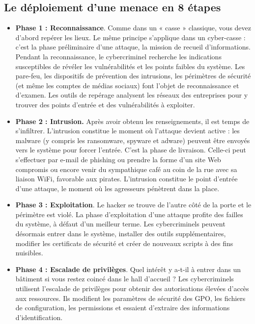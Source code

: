 \subsection{Le déploiement d'une menace en 8 étapes}


\begin{itemize}
  \item \textbf{Phase 1 : Reconnaissance}. Comme dans un « casse » classique, vous devez d’abord repérer les lieux. Le même principe s’applique dans un cyber-casse : c’est la phase préliminaire d’une attaque, la mission de recueil d’informations. Pendant la reconnaissance, le cybercriminel recherche les indications susceptibles de révéler les vulnérabilités et les points faibles du système. Les pare-feu, les dispositifs de prévention des intrusions, les périmètres de sécurité (et même les comptes de médias sociaux) font l’objet de reconnaissance et d’examen. Les outils de repérage analysent les réseaux des entreprises pour y trouver des points d’entrée et des vulnérabilités à exploiter.

 \item \textbf{Phase 2 : Intrusion.} Après avoir obtenu les renseignements, il est temps de s’infiltrer. L’intrusion constitue le moment où l’attaque devient active : les malware (y compris les ransomware, spyware et adware) peuvent être envoyés vers le système pour forcer l’entrée. C’est la phase de livraison. Celle-ci peut s’effectuer par e-mail de phishing ou prendre la forme d’un site Web compromis ou encore venir du sympathique café au coin de la rue avec sa liaison WiFi, favorable aux pirates. L’intrusion constitue le point d’entrée d’une attaque, le moment où les agresseurs pénètrent dans la place.

 \item \textbf{Phase 3 : Exploitation}. Le hacker se trouve de l’autre côté de la porte et le périmètre est violé. La phase d’exploitation d’une attaque profite des failles du système, à défaut d’un meilleur terme. Les cybercriminels peuvent désormais entrer dans le système, installer des outils supplémentaires, modifier les certificats de sécurité et créer de nouveaux scripts à des fins nuisibles.

 \item \textbf{Phase 4 : Escalade de privilèges}. Quel intérêt y a-t-il à entrer dans un bâtiment si vous restez coincé dans le hall d’accueil ? Les cybercriminels utilisent l’escalade de privilèges pour obtenir des autorisations élevées d’accès aux ressources. Ils modifient les paramètres de sécurité des GPO, les fichiers de configuration, les permissions et essaient d’extraire des informations d’identification.


\end{itemize}
